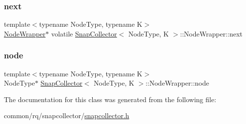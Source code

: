 \subsubsection{\texorpdfstring{next}{next}}
{\footnotesize\ttfamily template$<$typename Node\+Type, typename K$>$ \\
\hyperlink{classSnapCollector_1_1NodeWrapper}{Node\+Wrapper}$\ast$ volatile \hyperlink{classSnapCollector}{Snap\+Collector}$<$ Node\+Type, K $>$\+::Node\+Wrapper\+::next}

\mbox{\label{classSnapCollector_1_1NodeWrapper_afd1dd8bfffc9b360fa20f32689365d54}} 
\subsubsection{\texorpdfstring{node}{node}}
{\footnotesize\ttfamily template$<$typename Node\+Type, typename K$>$ \\
Node\+Type$\ast$ \hyperlink{classSnapCollector}{Snap\+Collector}$<$ Node\+Type, K $>$\+::Node\+Wrapper\+::node}



The documentation for this class was generated from the following file\+:\begin{DoxyCompactItemize}
\item 
common/rq/snapcollector/\hyperlink{snapcollector_8h}{snapcollector.\+h}\end{DoxyCompactItemize}
